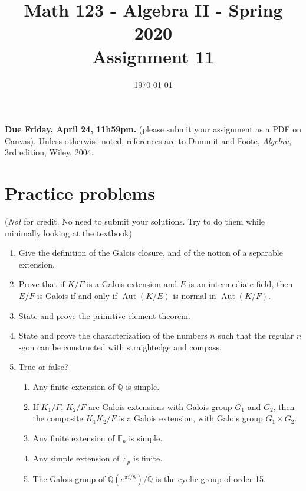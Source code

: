 \documentclass{amsart}
\title[Math 123, Spring 2020: assignment 11]{Math 123 - Algebra II - Spring 2020 \\ Assignment 11}
\date{\today}
\theoremstyle{definition}
\newcommand{\Qq}{\mathbb{Q}}
\newcommand{\Ff}{\mathbb{F}}
\newcommand{\Aut}{\operatorname{Aut}}
\begin{document}

\vspace*{-10em}
\maketitle

\textbf{Due Friday, April 24, 11h59pm.} (please submit your assignment as a PDF on Canvas). Unless otherwise noted, references are to Dummit and Foote, \emph{Algebra}, 3rd edition, Wiley, 2004.

\section*{Practice problems} (\emph{Not} for credit. No need to submit your solutions. Try to do them while minimally looking at the textbook)

\begin{enumerate}
\item Give the definition of the Galois closure, and of the notion of a separable extension.
\item Prove that if $K / F$ is a Galois extension and $E$ is an intermediate field, then $E / F$ is Galois if and only if $\Aut (K / E)$ is normal in $\Aut (K / F)$.
\item State and prove the primitive element theorem.
\item State and prove the characterization of the numbers $n$ such that the regular $n$-gon can be constructed with straightedge and compass.
\item True or false?
  \begin{enumerate}
  \item Any finite extension of $\Qq$ is simple.
  \item If $K_1 / F$, $K_2 / F$ are Galois extensions with Galois group $G_1$ and $G_2$, then the composite $K_1 K_2 / F$ is a Galois extension, with Galois group $G_1 \times G_2$.
  \item Any finite extension of $\Ff_p$ is simple.
  \item Any simple extension of $\Ff_p$ is finite.
  \item The Galois group of $\Qq (e^{\pi i / 8}) / \Qq$ is the cyclic group of order 15.
  \end{enumerate}
\end{enumerate}
\end{document}
